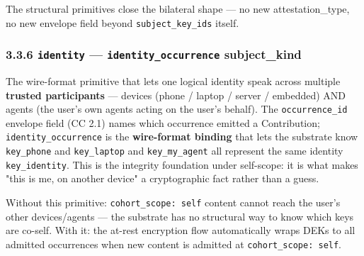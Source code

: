 \documentclass[11pt]{article}
\begin{document}
The structural primitives close the bilateral shape — no new attestation\_type, no new envelope field beyond \texttt{subject\_key\_ids} itself.


\subsubsection*{3.3.6 \texttt{identity} — \texttt{identity\_occurrence} subject\_kind}


The wire-format primitive that lets one logical identity speak across multiple \textbf{trusted participants} — devices (phone / laptop / server / embedded) AND agents (the user's own agents acting on the user's behalf). The \texttt{occurrence\_id} envelope field (CC 2.1) names which occurrence emitted a Contribution; \texttt{identity\_occurrence} is the \textbf{wire-format binding} that lets the substrate know \texttt{key\_phone} and \texttt{key\_laptop} and \texttt{key\_my\_agent} all represent the same identity \texttt{key\_identity}. This is the integrity foundation under self-scope: it is what makes "this is me, on another device" a cryptographic fact rather than a guess.


Without this primitive: \texttt{cohort\_scope: self} content cannot reach the user's other devices/agents — the substrate has no structural way to know which keys are co-self. With it: the at-rest encryption flow automatically wraps DEKs to all admitted occurrences when new content is admitted at \texttt{cohort\_scope: self}.
\end{document}
